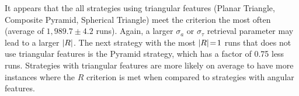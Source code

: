 It appears that the all strategies using triangular features (Planar Triangle, Composite Pyramid, Spherical Triangle)
meet the criterion the most often (average of $1{,}989.7 \pm 4.2$ runs).
Again, a larger $\sigma_a$ or $\sigma_\tau$ retrieval parameter may lead to a larger $\left| R \right|$.
The next strategy with the most $\left| R \right| \!=\! 1$ runs that does not use triangular features is the Pyramid strategy,
which has a factor of 0.75 less runs.
Strategies with triangular features are more likely on average to have more instances where the $R$ criterion is met
when compared to strategies with angular features.

